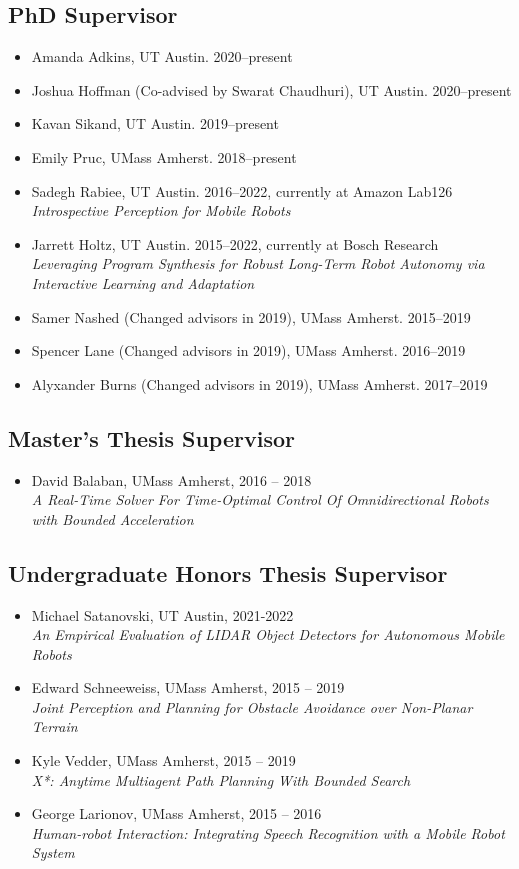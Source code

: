 \documentclass[Times]{article}
\begin{document}
\subsection*{PhD Supervisor}
\begin{itemize}
 \item Amanda Adkins, UT Austin. 2020--present
 \item Joshua Hoffman (Co-advised by Swarat Chaudhuri), UT Austin. 2020--present
 \item Kavan Sikand, UT Austin. 2019--present
 \item Emily Pruc, UMass Amherst. 2018--present
 \item Sadegh Rabiee, UT Austin. 2016--2022, currently at Amazon Lab126 \\
 \emph{Introspective Perception for Mobile Robots}
 \item Jarrett Holtz, UT Austin. 2015--2022, currently at Bosch Research \\
 \emph{Leveraging Program Synthesis for Robust Long-Term Robot Autonomy via\\ Interactive Learning and Adaptation}
 \item Samer Nashed (Changed advisors in 2019), UMass Amherst. 2015--2019
 \item Spencer Lane (Changed advisors in 2019), UMass Amherst. 2016--2019
 \item Alyxander Burns (Changed advisors in 2019), UMass Amherst. 2017--2019
\end{itemize}

\subsection*{Master's Thesis Supervisor}
\begin{itemize}
 \item David Balaban, UMass Amherst, 2016 -- 2018\\
 \emph{A Real-Time Solver For Time-Optimal Control Of Omnidirectional Robots with Bounded Acceleration}
\end{itemize}

\subsection*{Undergraduate Honors Thesis Supervisor}
\begin{itemize}
 \item Michael Satanovski, UT Austin, 2021-2022\\
 \emph{An Empirical Evaluation of LIDAR Object Detectors for Autonomous Mobile Robots}
 \item Edward Schneeweiss, UMass Amherst, 2015 -- 2019\\
  \emph{Joint Perception and Planning for Obstacle Avoidance over Non-Planar Terrain}
 \item Kyle Vedder, UMass Amherst, 2015 -- 2019\\
  \emph{X*: Anytime Multiagent Path Planning With Bounded Search}
 \item George Larionov, UMass Amherst, 2015 -- 2016\\
  \emph{Human-robot Interaction: Integrating Speech Recognition with a Mobile Robot System}
\end{itemize}
\end{document}
